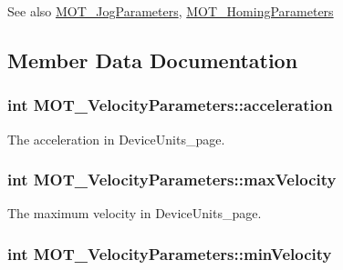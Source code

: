 \begin{DoxySeeAlso}{See also}
\hyperlink{struct_m_o_t___jog_parameters}{M\+O\+T\+\_\+\+Jog\+Parameters}, \hyperlink{struct_m_o_t___homing_parameters}{M\+O\+T\+\_\+\+Homing\+Parameters}


\end{DoxySeeAlso}


\subsection{Member Data Documentation}
\subsubsection[{\texorpdfstring{acceleration}{acceleration}}]{\setlength{\rightskip}{0pt plus 5cm}int M\+O\+T\+\_\+\+Velocity\+Parameters\+::acceleration}\hypertarget{struct_m_o_t___velocity_parameters_a0aed3b217348ddbe699e07b17de85885}{}\label{struct_m_o_t___velocity_parameters_a0aed3b217348ddbe699e07b17de85885}


The acceleration in Device\+Units\+\_\+page. 

\subsubsection[{\texorpdfstring{max\+Velocity}{maxVelocity}}]{\setlength{\rightskip}{0pt plus 5cm}int M\+O\+T\+\_\+\+Velocity\+Parameters\+::max\+Velocity}\hypertarget{struct_m_o_t___velocity_parameters_ade7ffd47f4ab85179a3155c989177da4}{}\label{struct_m_o_t___velocity_parameters_ade7ffd47f4ab85179a3155c989177da4}


The maximum velocity in Device\+Units\+\_\+page. 

\subsubsection[{\texorpdfstring{min\+Velocity}{minVelocity}}]{\setlength{\rightskip}{0pt plus 5cm}int M\+O\+T\+\_\+\+Velocity\+Parameters\+::min\+Velocity}\hypertarget{struct_m_o_t___velocity_parameters_af74f2509960f744e7795bf052e50f783}{}\label{struct_m_o_t___velocity_parameters_af74f2509960f744e7795bf052e50f783}


